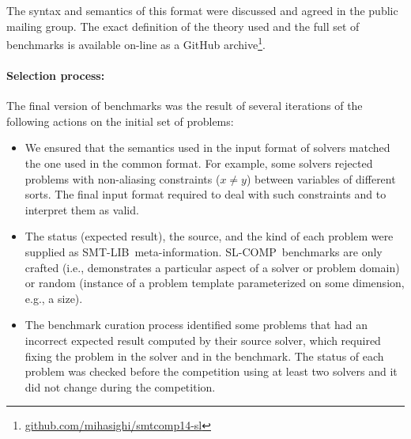 \documentclass[twoside,11pt]{article}
\newcommand{\smtlib}{\textsf{SMT-LIB}}
\newcommand{\slcomp}{\textsf{SL-COMP}}
\begin{document}
The syntax and semantics of this format were discussed and agreed in the public mailing group. 
The exact definition of the theory used and the full set of benchmarks is available on-line as a GitHub archive\footnote{\url{github.com/mihasighi/smtcomp14-sl}}.

\paragraph{Selection process:} The final version of benchmarks was the result of several iterations of the following actions on the initial set of problems:
\begin{itemize}
\item We ensured that the semantics used in the input format of solvers matched the one used in the common format. 
For example, some solvers rejected problems with non-aliasing constraints ($x\neq y$) between variables of different sorts. The final input format required to deal with such constraints and to interpret them as valid.

\item The status (expected result), the source, and the kind of each problem were supplied as \smtlib\ meta-information.
\slcomp\ benchmarks are only crafted (i.e., demonstrates a particular aspect of a solver or problem domain) or
random (instance of a problem template parameterized on some dimension, e.g., a size).

\item The benchmark curation process identified some problems that had an incorrect expected result computed by their source solver, which required fixing the problem in the solver and in the benchmark.
The status of each problem was checked before the competition using at least two solvers and it did not change during the competition. 
\end{itemize}
\end{document}
